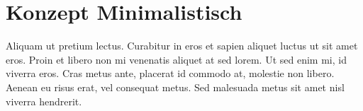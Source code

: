 \section{Konzept Minimalistisch}
\label{sec:chapter04:minimal}
Aliquam ut pretium lectus. Curabitur in eros et sapien aliquet luctus ut sit amet eros. Proin et libero non mi venenatis aliquet at sed lorem. Ut sed enim mi, id viverra eros. Cras metus ante, placerat id commodo at, molestie non libero. Aenean eu risus erat, vel consequat metus. Sed malesuada metus sit amet nisl viverra hendrerit.


